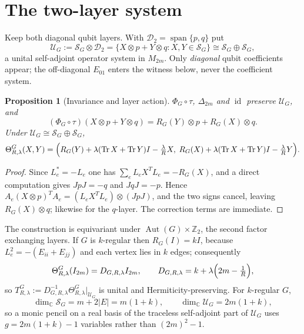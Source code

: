 \documentclass[11pt,reqno]{amsart}
\theoremstyle{plain}
\newtheorem{proposition}[theorem]{Proposition}
\theoremstyle{remark}
\DeclareMathOperator{\Tr}{Tr}
\DeclareMathOperator{\id}{id}
\newcommand{\cS}{\mathcal S}
\newcommand{\cU}{\mathcal U}
\newcommand{\cD}{\mathcal D}
\newcommand{\abs}[1]{\lvert #1\rvert}
\newcommand{\C}{\mathbb C}
\begin{document}
\section{The two-layer system}

Keep both diagonal qubit layers.  With $\cD_2=\operatorname{span}\{p,q\}$ put
\begin{equation}
\label{eq:ug}
    \cU_G:=\cS_G\otimes\cD_2
    =\{X\otimes p+Y\otimes q:X,Y\in\cS_G\}
    \cong\cS_G\oplus\cS_G,
\end{equation}
a unital self-adjoint operator system in $M_{2m}$.  Only \emph{diagonal} qubit
coefficients appear; the off-diagonal $E_{01}$ enters the witness below, never
the coefficient system.

\begin{proposition}[Invariance and layer action]
\label{prop:layers}
$\Phi_G\circ\tau$, $\Delta_{2m}$ and $\id$ preserve $\cU_G$, and
\begin{equation}
\label{eq:layer}
    (\Phi_G\circ\tau)(X\otimes p+Y\otimes q)
    =R_G(Y)\otimes p+R_G(X)\otimes q .
\end{equation}
Under $\cU_G\cong\cS_G\oplus\cS_G$,
\[
    \Theta^G_{R,\lambda}(X,Y)
    =\Bigl(R_G(Y)+\lambda(\Tr X+\Tr Y)I-\tfrac\lambda RX,\;
           R_G(X)+\lambda(\Tr X+\Tr Y)I-\tfrac\lambda RY\Bigr).
\]
\end{proposition}

\begin{proof}
Since $L_e^*=-L_e$ one has $\sum_eL_eX^TL_e=-R_G(X)$, and a direct computation
gives $JpJ=-q$ and $JqJ=-p$.  Hence
$A_e(X\otimes p)^TA_e=(L_eX^TL_e)\otimes(JpJ)$, and the two signs cancel,
leaving $R_G(X)\otimes q$; likewise for the $q$-layer.  The correction terms
are immediate.
\end{proof}

The construction is equivariant under $\operatorname{Aut}(G)\times\mathbb Z_2$,
the second factor exchanging layers.  If $G$ is $k$-regular then
$R_G(I)=kI$, because $L_e^2=-(E_{ii}+E_{jj})$ and each vertex lies in $k$
edges; consequently
\begin{equation}
\label{eq:unital}
    \Theta^G_{R,\lambda}(I_{2m})=D_{G,R,\lambda}I_{2m},
    \qquad
    D_{G,R,\lambda}=k+\lambda\Bigl(2m-\tfrac1R\Bigr),
\end{equation}
so $T^G_{R,\lambda}:=D_{G,R,\lambda}^{-1}\Theta^G_{R,\lambda}|_{\cU_G}$ is
unital and Hermiticity-preserving.  For $k$-regular $G$,
\begin{equation}
\label{eq:dim}
    \dim_\C\cS_G=m+2\abs E=m(1+k),
    \qquad
    \dim_\C\cU_G=2m(1+k),
\end{equation}
so a monic pencil on a real basis of the traceless self-adjoint part of $\cU_G$
uses $g=2m(1+k)-1$ variables rather than $(2m)^2-1$.
\end{document}
